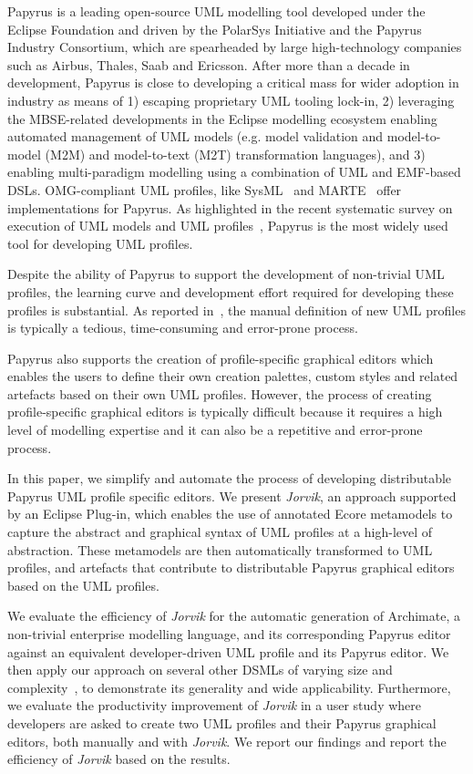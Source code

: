 Papyrus \cite{lanusse2009papyrus} is a leading open-source UML modelling tool developed under the Eclipse Foundation and driven by the PolarSys Initiative and the Papyrus Industry Consortium, which are spearheaded by large high-technology companies such as Airbus, Thales, Saab and Ericsson. 
After more than a decade in development, Papyrus is close to developing a critical mass for wider adoption in industry as means of 1) escaping proprietary UML tooling lock-in, 2) leveraging the MBSE-related developments in the Eclipse modelling ecosystem enabling automated management of UML models (e.g. model validation and model-to-model (M2M) and model-to-text (M2T) transformation languages), and 3) enabling multi-paradigm modelling using a combination of UML and EMF-based DSLs. 
OMG-compliant UML profiles, like SysML~\cite{friedenthal2014practical} and MARTE~\cite{omg2011marte} offer implementations for Papyrus. 
As highlighted in the recent systematic survey on execution of UML models and UML profiles~\cite{ciccozzi2018execution}, Papyrus is the most widely used tool for developing UML profiles. 

Despite the ability of Papyrus to support the development of non-trivial UML profiles, the learning curve and development effort required for developing these profiles is substantial.
As reported in~\cite{Wimmer2009:IJWIS}, the manual definition of new UML profiles is typically a tedious, time-consuming and error-prone process.

Papyrus also supports the creation of profile-specific graphical editors which enables the users to define their own creation palettes, custom styles and related artefacts based on their own UML profiles. 
However, the process of creating profile-specific graphical editors is typically difficult because it requires a high level of modelling expertise and it can also be a repetitive and error-prone process.

In this paper, we simplify and automate the process of developing distributable Papyrus UML profile specific editors. 
We present \textit{Jorvik}, an approach supported by an Eclipse Plug-in, which enables the use of annotated Ecore metamodels to capture the abstract and graphical syntax of UML profiles at a high-level of abstraction. These metamodels are then automatically transformed to UML profiles, and artefacts that contribute to distributable Papyrus graphical editors based on the UML profiles. 


We evaluate the efficiency of \textit{Jorvik} for the automatic generation of Archimate, a non-trivial enterprise modelling language, and its corresponding Papyrus editor against an equivalent developer-driven UML profile and its Papyrus editor. 
We then apply our approach on several other DSMLs of varying size and complexity~\cite{williams2013metamodels}, to demonstrate its generality and wide applicability. 
Furthermore, we evaluate the productivity improvement of \textit{Jorvik} in a user study where developers are asked to create two UML profiles and their Papyrus graphical editors, both manually and with \textit{Jorvik}.
We report our findings and report the efficiency of \textit{Jorvik} based on the results. 

